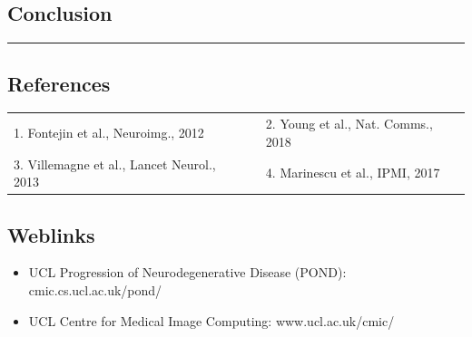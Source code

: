 \documentclass[portrait,a0,final,20pt]{a0poster}
\begin{document}
{\begin{multicols}{2}
\section*{Conclusion}






\end{multicols}
\hrule


}


\begin{multicols}{2}
\raggedcolumns	

\subsection*{References}

\large{
\begin{tabular}{l p{0.5cm} l}
 1. Fontejin et al., Neuroimg., 2012 & & 2. Young et al., Nat. Comms., 2018\\
 3. Villemagne et al., Lancet Neurol., 2013 & & 4. Marinescu et al., IPMI, 2017\\
\end{tabular}

\columnbreak

\subsection*{Weblinks}
\begin{itemize}
\item UCL Progression of Neurodegenerative Disease (POND): cmic.cs.ucl.ac.uk/pond/
\item UCL Centre for Medical Image Computing: www.ucl.ac.uk/cmic/
\end{itemize}
}



\end{multicols}
\end{document}
